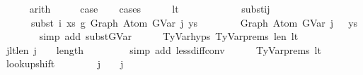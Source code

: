 \begin{isabellebody}
\ \ \ \ \isamarkupfalse%
\ arith\isanewline
\ \ \isamarkupfalse%
\ \isamarkupfalse%
\ {\isacharquery}{\kern0pt}case\isanewline
\ \ \isamarkupfalse%
\ cases\isanewline
\ \ \ \ \isamarkupfalse%
\ lt\isanewline
\isanewline
\ \ \ \ \isanewline
\ \ \ \ \isamarkupfalse%
\ \isamarkupfalse%
\ subst{\isacharunderscore}{\kern0pt}ij{\isacharcolon}{\kern0pt}\isanewline
\ \ \ \ \ \ {\isachardoublequoteopen}subst\ i\ xs\ g{}\ {\isacharparenleft}{\kern0pt}Graph\ {\isacharparenleft}{\kern0pt}Atom\ {\isacharparenleft}{\kern0pt}GVar\ j{\isacharparenright}{\kern0pt}\ ys{\isacharparenright}{\kern0pt}{\isacharparenright}{\kern0pt}\isanewline
\ \ \ \ \ \ \ {\isacharequal}{\kern0pt}\ Graph\ {\isacharparenleft}{\kern0pt}Atom\ {\isacharparenleft}{\kern0pt}GVar\ {\isacharparenleft}{\kern0pt}j\ {\isacharminus}{\kern0pt}\ {}{\isacharparenright}{\kern0pt}{\isacharparenright}{\kern0pt}\ ys{\isacharparenright}{\kern0pt}{\isachardoublequoteclose}\isanewline
\ \ \ \ \ \ \isamarkupfalse%
\ {\isacharparenleft}{\kern0pt}simp\ add{\isacharcolon}{\kern0pt}\ subst{\isacharunderscore}{\kern0pt}GVar{\isacharparenright}{\kern0pt}\isanewline
\isanewline
\ \ \ \ \isamarkupfalse%
\ TyVar{\isachardot}{\kern0pt}hyps{\isacharparenleft}{\kern0pt}{}{\isacharparenright}{\kern0pt}\ TyVar{\isachardot}{\kern0pt}prems{\isacharparenleft}{\kern0pt}{}{\isacharparenright}{\kern0pt}\ len{\isacharunderscore}{\kern0pt}{\isasymGamma}{}\ lt\isanewline
\ \ \ \ \isamarkupfalse%
\ j{}{\isacharunderscore}{\kern0pt}lt{\isacharunderscore}{\kern0pt}len{\isacharunderscore}{\kern0pt}{\isasymGamma}{}{\isacharcolon}{\kern0pt}\ {\isachardoublequoteopen}j\ {\isacharminus}{\kern0pt}\ {}\ {\isacharless}{\kern0pt}\ length\ {\isasymGamma}{}{\isachardoublequoteclose}\isanewline
\ \ \ \ \ \ \isamarkupfalse%
\ {\isacharparenleft}{\kern0pt}simp\ add{\isacharcolon}{\kern0pt}\ less{\isacharunderscore}{\kern0pt}diff{\isacharunderscore}{\kern0pt}conv{\isacharparenright}{\kern0pt}\isanewline
\isanewline
\ \ \ \ \isamarkupfalse%
\ TyVar{\isachardot}{\kern0pt}prems{\isacharparenleft}{\kern0pt}{}{\isacharparenright}{\kern0pt}\ lt\isanewline
\ \ \ \ \isamarkupfalse%
\ lookup{\isacharunderscore}{\kern0pt}shift{\isacharcolon}{\kern0pt}\isanewline
\ \ \ \ \ \ {\isachardoublequoteopen}{\isasymGamma}\ {\isacharbang}{\kern0pt}\ j\ {\isacharequal}{\kern0pt}\ {\isasymGamma}{}\ {\isacharbang}{\kern0pt}\ {\isacharparenleft}{\kern0pt}j\ {\isacharminus}{\kern0pt}\ {}{\isacharparenright}{\kern0pt}{\isachardoublequoteclose}\isanewline

\end{isabellebody}
